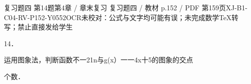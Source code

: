 \begin{bankitem}{复习题四 第14题}{第4章 / 章末复习 复习题四 / 教材 p.152 / PDF 第159页}{XJ-B1-C04-RV-P152-Y0552}{OCR未校对：公式与文字均可能有误；未完成数学TeX转写；禁止直接发给学生}
\begin{ocrdraft}
\par
14．
\par
运用图象法，判断函数不一21n与g(x）一一4x十5的图象的交点
\par
个数．
\end{ocrdraft}
\end{bankitem}
